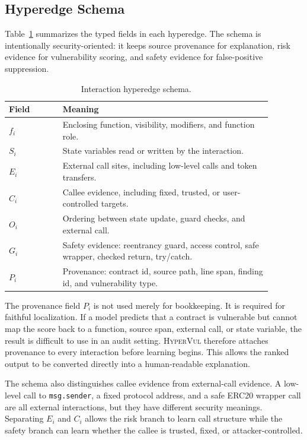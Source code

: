 \documentclass[conference]{IEEEtran}
\newcommand{\tool}{\textsc{HyperVul}}
\begin{document}
\subsection{Hyperedge Schema}

Table~\ref{tab:hyperedge_schema} summarizes the typed fields in each hyperedge. The schema is intentionally security-oriented: it keeps source provenance for explanation, risk evidence for vulnerability scoring, and safety evidence for false-positive suppression.

\begin{table}[t]
\centering
\caption{Interaction hyperedge schema.}
\label{tab:hyperedge_schema}
\scriptsize
\begin{tabular}{p{0.18\linewidth}p{0.70\linewidth}}
\toprule
\textbf{Field} & \textbf{Meaning} \\
\midrule
$f_i$ & Enclosing function, visibility, modifiers, and function role. \\
$S_i$ & State variables read or written by the interaction. \\
$E_i$ & External call sites, including low-level calls and token transfers. \\
$C_i$ & Callee evidence, including fixed, trusted, or user-controlled targets. \\
$O_i$ & Ordering between state update, guard checks, and external call. \\
$G_i$ & Safety evidence: reentrancy guard, access control, safe wrapper, checked return, try/catch. \\
$P_i$ & Provenance: contract id, source path, line span, finding id, and vulnerability type. \\
\bottomrule
\end{tabular}
\end{table}

The provenance field $P_i$ is not used merely for bookkeeping. It is required for faithful localization. If a model predicts that a contract is vulnerable but cannot map the score back to a function, source span, external call, or state variable, the result is difficult to use in an audit setting. \tool{} therefore attaches provenance to every interaction before learning begins. This allows the ranked output to be converted directly into a human-readable explanation.

The schema also distinguishes callee evidence from external-call evidence. A low-level call to \texttt{msg.sender}, a fixed protocol address, and a safe ERC20 wrapper call are all external interactions, but they have different security meanings. Separating $E_i$ and $C_i$ allows the risk branch to learn call structure while the safety branch can learn whether the callee is trusted, fixed, or attacker-controlled.
\end{document}
